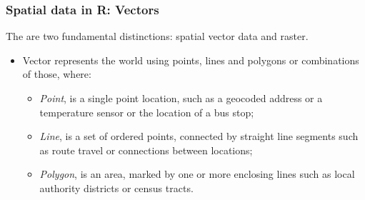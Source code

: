\documentclass[12pt]{beamer}
\begin{document}

\begin{frame}
\frametitle{Spatial data in R: Vectors}
The are two fundamental distinctions: spatial \alert{vector} data and \alert{raster}.
\begin{itemize}
  \item \vfill \alert{Vector} represents the world using \alert{points}, \alert{lines} and \alert{polygons} or combinations of those, where:
      \begin{itemize}
      \item \vfill \emph{Point}, is a single point location, such as a geocoded address or a temperature sensor or the location of a bus stop;
      \item \vfill \emph{Line}, is a set of ordered points, connected by straight line segments such as route travel or connections between locations;
      \item \vfill \emph{Polygon}, is an area, marked by one or more enclosing lines such as local authority districts or census tracts.
      \end{itemize}
\end{itemize}
\end{frame}
\end{document}
